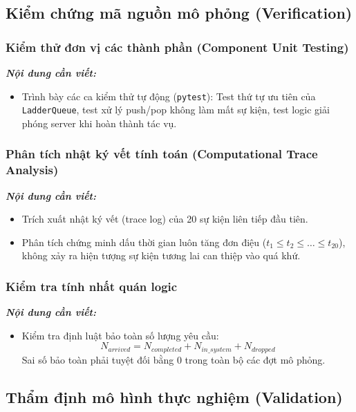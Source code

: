 \subsection{Kiểm chứng mã nguồn mô phỏng (Verification)}
\label{subsec:verification}

\subsubsection{Kiểm thử đơn vị các thành phần (Component Unit Testing)}
\textit{\textbf{Nội dung cần viết:}}
\begin{itemize}[leftmargin=1.5em]
    \item Trình bày các ca kiểm thử tự động (\texttt{pytest}): Test thứ tự ưu tiên của \texttt{LadderQueue}, test xử lý push/pop không làm mất sự kiện, test logic giải phóng server khi hoàn thành tác vụ.
\end{itemize}

\subsubsection{Phân tích nhật ký vết tính toán (Computational Trace Analysis)}
\textit{\textbf{Nội dung cần viết:}}
\begin{itemize}[leftmargin=1.5em]
    \item Trích xuất nhật ký vết (trace log) của 20 sự kiện liên tiếp đầu tiên.
    \item Phân tích chứng minh dấu thời gian luôn tăng đơn điệu ($t_1 \le t_2 \le \dots \le t_{20}$), không xảy ra hiện tượng sự kiện tương lai can thiệp vào quá khứ.
\end{itemize}

\subsubsection{Kiểm tra tính nhất quán logic}
\textit{\textbf{Nội dung cần viết:}}
\begin{itemize}[leftmargin=1.5em]
    \item Kiểm tra định luật bảo toàn số lượng yêu cầu:
    \begin{equation}
        N_{arrived} = N_{completed} + N_{in\_system} + N_{dropped}
    \end{equation}
    Sai số bảo toàn phải tuyệt đối bằng 0 trong toàn bộ các đợt mô phỏng.
\end{itemize}

\subsection{Thẩm định mô hình thực nghiệm (Validation)}
\label{subsec:validation}


